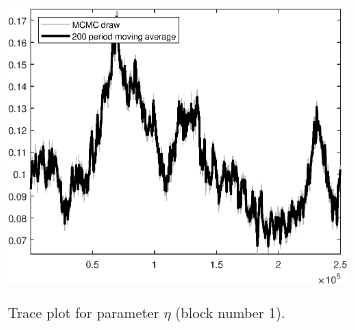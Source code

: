 \begin{figure}[H]
\centering
  \includegraphics[width=0.8\textwidth]{BRS_growth_ext_comovement/graphs/TracePlot_eta_blck_1}\\
    \caption{Trace plot for parameter ${\eta}$ (block number 1).}
\end{figure}
